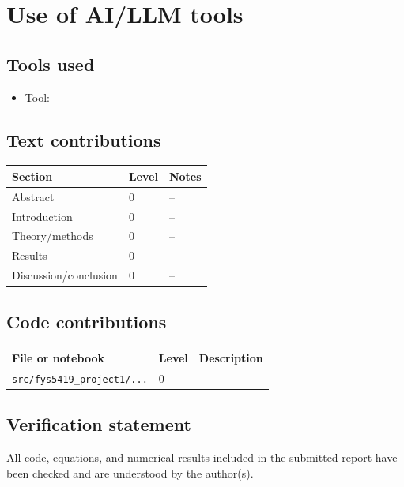 \appendix
\section{Use of AI/LLM tools}


\subsection{Tools used}

\begin{itemize}
    \item Tool: 
\end{itemize}

\subsection{Text contributions}

\begin{center}
\begin{tabular}{lll}
\toprule
Section & Level & Notes \\
\midrule
Abstract & 0 & -- \\
Introduction & 0 & -- \\
Theory/methods & 0 & -- \\
Results & 0 & -- \\
Discussion/conclusion & 0 & -- \\
\bottomrule
\end{tabular}
\end{center}

\subsection{Code contributions}

\begin{center}
\begin{tabular}{lll}
\toprule
File or notebook & Level & Description \\
\midrule
\texttt{src/fys5419\_project1/...} & 0 & -- \\
\bottomrule
\end{tabular}
\end{center}

\subsection{Verification statement}

All code, equations, and numerical results included in the submitted report have been checked and are understood by the author(s).
